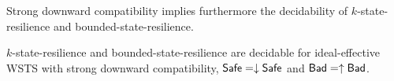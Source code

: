 

Strong downward compatibility implies furthermore the decidability
of {\sc $k$-state-resilience} and {\sc bounded-state-resilience}.

\begin{corollary}\label{downward brp}
{\sc $k$-state-resilience} and {\sc bounded-state-resilience} are decidable for ideal-effective WSTS with strong downward compatibility,
$\textsf{Safe} = \downarrow \textsf{Safe}$ and $\textsf{Bad} = \uparrow \textsf{Bad}$.
\end{corollary}




